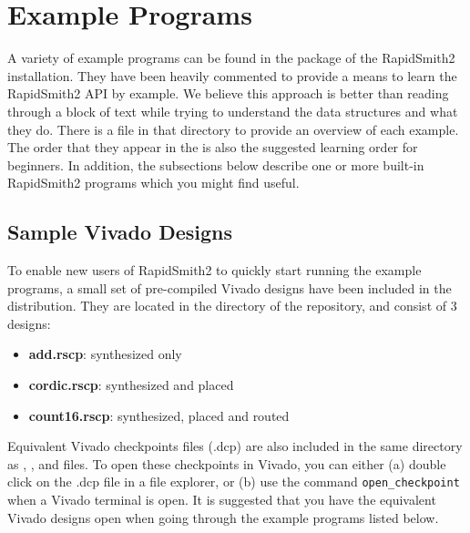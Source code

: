 \newpage
\section{Example Programs} \label{examples}
\graphicspath{{./techReportFigures/sec9_examples/}}

A variety of example programs can be found in the
 package of the RapidSmith2 installation.
They have been heavily commented to provide a means to learn the RapidSmith2 API by
example. We believe this approach is better than reading through a block of
text while trying to understand the data structures and what they do.
There is a  file in that directory to provide an overview of
each example. The order that they appear in the  is also the
suggested learning order for beginners. In addition, the subsections below
describe one or more built-in RapidSmith2 programs which you might find useful.

\subsection{Sample Vivado Designs}
To enable new users of RapidSmith2 to quickly start running the example
programs, a small set of pre-compiled Vivado designs have been included in the
distribution. They are located in the  directory of
the repository, and consist of 3 designs: 
\begin{itemize}
\item \textbf{add.rscp}: synthesized only
\item \textbf{cordic.rscp}: synthesized and placed
\item \textbf{count16.rscp}: synthesized, placed and routed
\end{itemize} 
Equivalent Vivado checkpoints files (.dcp) are also included in
the same directory as , , and 
files. To open these checkpoints in Vivado, you can either (a) double click on
the .dcp file in a file explorer, or (b) use the command
\texttt{open\_checkpoint} when a Vivado terminal is open. It is suggested that
you have the equivalent Vivado designs open when going through the example
programs listed below.


